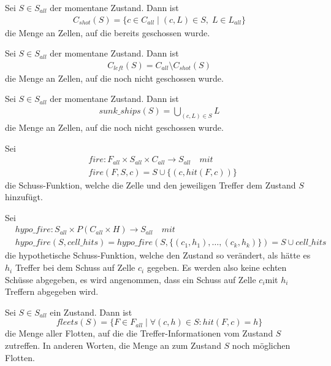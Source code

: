 \documentclass[a4paper,12pt]{llncs}
\numberwithin{equation}{section}
\begin{document}
\begin{definition}
Sei $S\in S_{all}$ der momentane Zustand.
Dann ist
\begin{align}
C_{shot}(S)=\{c \in C_{all} \mid (c,L) \in S, \; L \in L_{all}\}
\end{align}
 die Menge an Zellen, auf die bereits geschossen wurde.
\end{definition}

\begin{definition}
Sei $S\in S_{all}$ der momentane Zustand.
Dann ist 
\begin{align}
C_{left}(S)=C_{all} \setminus C_{shot}(S)
\end{align}
die Menge an Zellen, auf die noch nicht geschossen wurde.
\end{definition}

\begin{definition}
Sei $S\in S_{all}$ der momentane Zustand.
Dann ist 
\begin{align}
sunk\_ships(S)=\bigcup_{(c,L) \in S} L
\end{align}
die Menge an Zellen, auf die noch nicht geschossen wurde.
\end{definition}

\begin{definition}
Sei
\begin{align}
&fire:F_{all}\times S_{all}\times C_{all} \rightarrow S_{all} \quad mit \nonumber\\
&fire(F, S, c)=S \cup \{(c,hit(F, c))\}  \nonumber
\end{align}
die Schuss-Funktion, welche die Zelle und den jeweiligen Treffer dem Zustand $S$ hinzufügt.
\end{definition}

\begin{definition}
Sei
\begin{align}
&hypo\_fire:S_{all}\times P(C_{all}\times H) \rightarrow S_{all} \quad mit \nonumber\\
&hypo\_fire(S, cell\_hits)=hypo\_fire(S, \{(c_1,h_1), \dots, (c_k, h_k)\})=S \cup cell\_hits \nonumber
\end{align}
die hypothetische Schuss-Funktion, welche den Zustand so verändert, als hätte es $h_i$ Treffer bei dem Schuss auf Zelle $c_i$ gegeben. Es werden also keine echten Schüsse abgegeben, es wird angenommen, dass ein Schuss auf Zelle $c_i$mit $h_i$ Treffern abgegeben wird.
\end{definition}

\begin{definition}
Sei $S\in S_{all}$ ein Zustand.
Dann ist
\[
fleets(S)=\{F\in F_{all} \mid \forall (c,h) \in S \colon hit(F, c)=h\}
\]
die Menge aller Flotten, auf die die Treffer-Informationen vom Zustand $S$ zutreffen.
In anderen Worten, die Menge an zum Zustand $S$ noch möglichen Flotten.
\end{definition}
\end{document}
